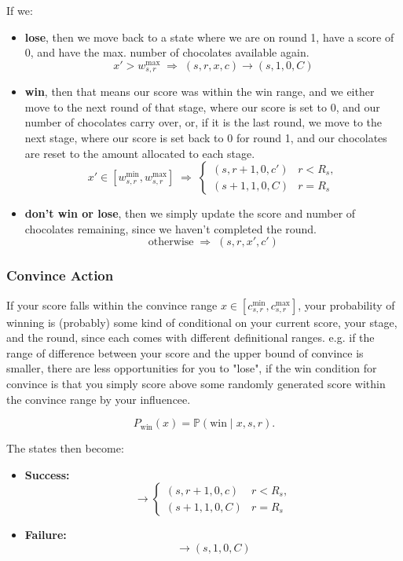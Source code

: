 \documentclass{article}
\begin{document}
If we:
\begin{itemize}
    \item \textbf{lose}, then we move back to a state where we are on round 1, 
    have a score of 0, and have the max. number of chocolates available again. 
    \[
    x' > w_{s,r}^{\max}
    \;\Rightarrow\;
    (s,r,x,c) \to (s,1,0,C)
    \]

    \item \textbf{win}, then that means our score was within the win range, 
    and we either move to the next round of that stage, where our score is set to 0, and our number of
    chocolates carry over, or, if it is the last round, we move to the next stage, where
    our score is set back to 0 for round 1, and our chocolates are reset to the amount allocated to each stage.
    \[
    x' \in [w_{s,r}^{\min}, w_{s,r}^{\max}]
    \;\Rightarrow\;
    \begin{cases}
    (s,r+1,0,c') & r < R_s, \\
    (s+1,1,0,C) & r = R_s
    \end{cases}
    \]

    \item \textbf{don't win or lose}, then we simply update the score and number of chocolates remaining, since
    we haven't completed the round. 
    \[
    \text{otherwise} \;\Rightarrow\; (s,r,x',c')
    \]
\end{itemize}

\subsubsection{Convince Action}

If your score falls within the convince range $x \in [c_{s,r}^{\min}, c_{s,r}^{\max}]$, 
your probability of winning is (probably) some kind of conditional on your current score, 
your stage, and the round, since each comes with different definitional ranges. e.g. if the range of 
difference between your score and the upper bound of convince is smaller, there are less
opportunities for you to "lose", if the win condition for convince is that you simply score above some
randomly generated score within the convince range by your influencee. 

\[
P_{\text{win}}(x) = \mathbb{P}(\text{win} \mid x, s, r).
\]

The states then become:
\begin{itemize}
    \item \textbf{Success:}
    \[
    \to
    \begin{cases}
    (s,r+1,0,c) & r < R_s, \\
    (s+1,1,0,C) & r = R_s
    \end{cases}
    \]

    \item \textbf{Failure:}
    \[
    \to (s,1,0,C)
    \]
\end{itemize}
\end{document}
